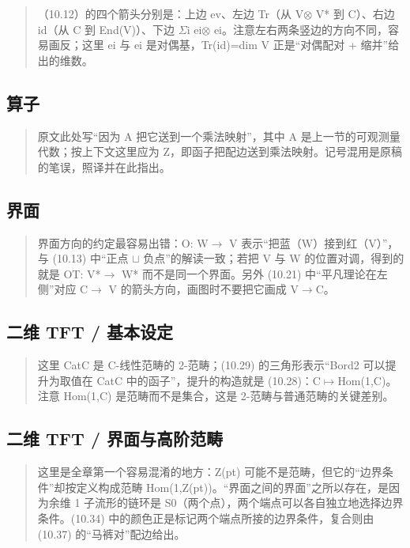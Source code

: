 \begin{quote}\small
（10.12）的四个箭头分别是：上边 ev、左边 Tr（从 V$\otimes$ V* 到 C）、右边 id（从 C 到 End(V)）、下边 $\Sigma$i ei$\otimes$ ei。注意左右两条竖边的方向不同，容易画反；这里 ei 与 ei 是对偶基，Tr(id)=dim V 正是“对偶配对 + 缩并”给出的维数。
\end{quote}

\subsection*{算子}
\begin{quote}\small
原文此处写“因为 A 把它送到一个乘法映射”，其中 A 是上一节的可观测量代数；按上下文这里应为 Z，即函子把配边送到乘法映射。记号混用是原稿的笔误，照译并在此指出。
\end{quote}

\subsection*{界面}
\begin{quote}\small
界面方向的约定最容易出错：O: W$\to$ V 表示“把蓝（W）接到红（V）”，与 (10.13) 中“正点 $\sqcup$ 负点”的解读一致；若把 V 与 W 的位置对调，得到的就是 OT: V*$\to$ W* 而不是同一个界面。另外 (10.21) 中“平凡理论在左侧”对应 C$\to$ V 的箭头方向，画图时不要把它画成 V$\to$C。
\end{quote}

\subsection*{二维 TFT / 基本设定}
\begin{quote}\small
这里 CatC 是 C-线性范畴的 2-范畴；(10.29) 的三角形表示“Bord2 可以提升为取值在 CatC 中的函子”，提升的构造就是 (10.28)：C$\mapsto$Hom(1,C)。注意 Hom(1,C) 是范畴而不是集合，这是 2-范畴与普通范畴的关键差别。
\end{quote}

\subsection*{二维 TFT / 界面与高阶范畴}
\begin{quote}\small
这里是全章第一个容易混淆的地方：Z(pt) 可能不是范畴，但它的“边界条件”却按定义构成范畴 Hom(1,Z(pt))。“界面之间的界面”之所以存在，是因为余维 1 子流形的链环是 S0（两个点），两个端点可以各自独立地选择边界条件。(10.34) 中的颜色正是标记两个端点所接的边界条件，复合则由 (10.37) 的“马裤对”配边给出。
\end{quote}

